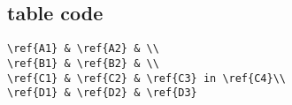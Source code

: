 \documentclass[a4paper]{article}
\begin{document}
\subsection{table code}
\begin{verbatim}
\ref{A1} & \ref{A2} & \\
\ref{B1} & \ref{B2} & \\
\ref{C1} & \ref{C2} & \ref{C3} in \ref{C4}\\
\ref{D1} & \ref{D2} & \ref{D3}
\end{verbatim}
\end{document}
